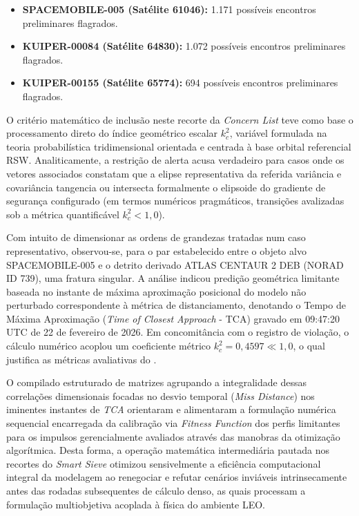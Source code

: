 \begin{itemize}
    \item \textbf{SPACEMOBILE-005 (Satélite 61046):} 1.171 possíveis encontros preliminares flagrados.
    \item \textbf{KUIPER-00084 (Satélite 64830):} 1.072 possíveis encontros preliminares flagrados.
    \item \textbf{KUIPER-00155 (Satélite 65774):} 694 possíveis encontros preliminares flagrados.
\end{itemize}

O critério matemático de inclusão neste recorte da \textit{Concern List} teve como base o processamento direto do índice geométrico escalar $k_c^2$, variável formulada na teoria probabilística tridimensional orientada e centrada à base orbital referencial RSW. Analiticamente, a restrição de alerta acusa verdadeiro para casos onde os vetores associados constatam que a elipse representativa da referida variância e covariância tangencia ou intersecta formalmente o elipsoide do gradiente de segurança configurado (em termos numéricos pragmáticos, transições avalizadas sob a métrica quantificável $k_c^2 < 1,0$).

Com intuito de dimensionar as ordens de grandezas tratadas num caso representativo, observou-se, para o par estabelecido entre o objeto alvo SPACEMOBILE-005 e o detrito derivado ATLAS CENTAUR 2 DEB (NORAD ID 739), uma fratura singular. A análise indicou predição geométrica limitante baseada no instante de máxima aproximação posicional do modelo não perturbado correspondente à métrica de distanciamento, denotando o Tempo de Máxima Aproximação (\textit{Time of Closest Approach} - TCA) gravado em 09:47:20 UTC de 22 de fevereiro de 2026. Em concomitância com o registro de violação, o cálculo numérico acoplou um coeficiente métrico $k_c^2 = 0,4597 \ll 1,0$, o qual justifica as métricas avaliativas do .

O compilado estruturado de matrizes agrupando a integralidade dessas correlações dimensionais focadas no desvio temporal (\textit{Miss Distance}) nos iminentes instantes de \textit{TCA} orientaram e alimentaram a formulação numérica sequencial encarregada da calibração via \textit{Fitness Function} dos perfis limitantes para os impulsos gerencialmente avaliados através das manobras da otimização algorítmica. Desta forma, a operação matemática intermediária pautada nos recortes do \textit{Smart Sieve} otimizou sensivelmente a eficiência computacional integral da modelagem ao renegociar e refutar cenários inviáveis intrinsecamente antes das rodadas subsequentes de cálculo denso, as quais processam a formulação multiobjetiva acoplada à física do ambiente LEO.

